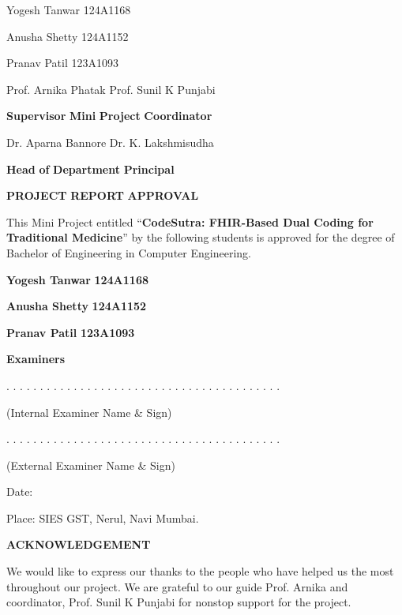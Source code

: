 \documentclass[12pt,a4paper,oneside]{report}
\begin{document}
\begin{center}Yogesh Tanwar	124A1168	\end{center}
\begin{center}Anusha Shetty	124A1152	\end{center}
\begin{center}Pranav Patil	123A1093	\end{center}
Prof. Arnika Phatak	Prof. Sunil K Punjabi

\textbf{     Supervisor}\textbf{	Mini}\textbf{ }\textbf{Project}\textbf{ }\textbf{Coordinator}

    Dr. Aparna Bannore	Dr. K. Lakshmisudha

\textbf{    Head}\textbf{ }\textbf{of}\textbf{ }\textbf{Department}\textbf{	}\textbf{Principal}

\begin{center}\textbf{PROJECT}\textbf{ }\textbf{REPORT}\textbf{ }\textbf{APPROVAL}\end{center}
This Mini Project entitled ``\textbf{CodeSutra}\textbf{: FHIR-Based Dual Coding for Traditional Medicine}'' by the following students is approved for the degree of Bachelor of Engineering in Computer Engineering.

\begin{center}\textbf{Yogesh Tanwar}\textbf{	124A1168}\textbf{	}\end{center}
\begin{center}\textbf{Anusha Shetty}\textbf{	124A1152}\textbf{	}\end{center}
\begin{center}\textbf{Pranav Patil}\textbf{	123A1093}\textbf{	}\end{center}
\begin{center}\textbf{Examiners}\end{center}
. . . . . . . . . . . . . . . . . . . . . . . . . . . . . . . . . . . . . . . . .

(Internal Examiner Name \& Sign)

. . . . . . . . . . . . . . . . . . . . . . . . . . . . . . . . . . . . . . . . .

(External Examiner Name \& Sign)

Date:

Place: SIES GST, Nerul, Navi Mumbai.

\begin{center}\textbf{ACKNOWLEDGEMENT}\end{center}
We would like to express our thanks to the people who have helped us the most throughout our project. We are grateful to our guide Prof. Arnika and coordinator, Prof. Sunil K Punjabi for nonstop support for the project.
\end{document}

